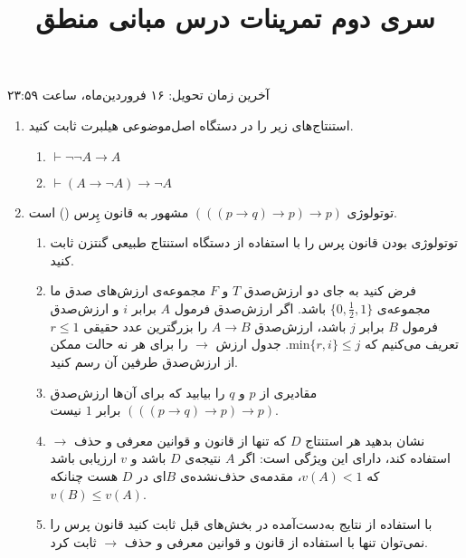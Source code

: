\documentclass[12pt, 14paper]{article}
\title{سری دوم تمرینات درس مبانی منطق}
\author{}
\date{}
\begin{document}
\maketitle

\vspace{-2.5cm}

\begin{center}آخرین زمان تحویل: ۱۶ فروردین‌ماه، ساعت ۲۳:۵۹\end{center}

\vspace{0.5cm}

\begin{enumerate}

\item
استنتاج‌های زیر را در دستگاه اصل‌موضوعی هیلبرت ثابت کنید.

\begin{enumerate}
\item
$\vdash \neg\neg A\to A$

\item
$\vdash (A\to\neg A)\to \neg A$
\end{enumerate}

\item
توتولوژی
$(((p\to q)\to p)\to p)$
مشهور به قانون پِرس
()
است.
\begin{enumerate}
\item
توتولوژی بودن قانون پرس را با استفاده از دستگاه استنتاج طبیعی گنتزن ثابت کنید.
\item
فرض کنید به جای دو ارزش‌صدق $T$ و $F$ مجموعه‌ی ارزش‌های صدق ما مجموعه‌ی $\{0,\frac{1}{2},1\}$ باشد. اگر ارزش‌صدق فرمول $A$ برابر $i$ و ارزش‌صدق فرمول $B$ برابر $j$ باشد، ارزش‌صدق $A\to B$ را بزرگترین عدد حقیقی $r\leq 1$ تعریف می‌کنیم که
$\text{min}\{r,i\}\leq j$.
جدول ارزش $\to$ را برای هر نه حالت ممکن از ارزش‌صدق طرفین آن رسم کنید.
\item
مقادیری از $p$ و $q$ را بیابید که برای آن‌ها ارزش‌صدق $(((p\to q)\to p)\to p)$ برابر $1$ نیست.
\item
نشان بدهید هر استنتاج $D$ که تنها از قانون
و قوانین معرفی و حذف $\to$ استفاده کند، دارای این ویژگی است: اگر $A$ نتیجه‌ی $D$ باشد و $v$ ارزیابی باشد که $v(A)<1$، مقدمه‌ی حذف‌نشده‌ی $B$ای در $D$ هست چنانکه $v(B)\leq v(A)$.
\item
با استفاده از نتایج به‌دست‌آمده در بخش‌های قبل ثابت کنید قانون پرس را نمی‌توان تنها با استفاده از قانون
و قوانین معرفی و حذف $\to$ ثابت کرد.
\end{enumerate}

\pagebreak


\end{enumerate}
\end{document}
